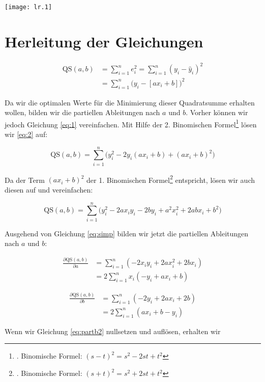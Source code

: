 \documentclass{scrartcl}
\def\qs{\text{QS}(a,b)}
\def\sm{\sum\limits_{i=1}^{n}}
\begin{document}
\begin{center}
\texttt{[image: lr.1]}
\end{center}

\section{Herleitung der Gleichungen}


\begin{align}\label{eq:1}
\qs	&= \sum_{i=1}^{n} e_i^2 = \sm (y_i - \hat{y}_i)^2\\
								&= \sm \Big(y_i - [ax_i+b]\Big)^2 \label{eq:2}
\end{align}

Da wir die optimalen Werte für die Minimierung dieser Quadratsumme erhalten wollen, bilden wir die partiellen Ableitungen nach $a$ und $b$. Vorher können wir jedoch Gleichung \ref{eq:1} vereinfachen. Mit Hilfe der 2. Binomischen Formel\footnote{. Binomische Formel: \((s-t)^2 = s^2 -2st + t^2\)} lösen wir \ref{eq:2} auf:

\begin{equation}
	\qs = \sm \Big(y_i^2 - 2y_i (ax_i+b) + (ax_i +b)^2\Big)
\end{equation}

Da der Term \((ax_i +b)^2\) der 1. Binomischen Formel\footnote{. Binomische Formel: \((s+t)^2 = s^2 +2st + t^2\)} entspricht, lösen wir auch diesen auf und vereinfachen:

\begin{equation}
	\qs = \sm \Big(y_i^2 - 2ax_iy_i - 2by_i + a^2x_i^2 + 2abx_i + b^2\Big)\label{eq:simp}
\end{equation}

Ausgehend von Gleichung \ref{eq:simp} bilden wir jetzt die partiellen Ableitungen nach $a$ und $b$:

\begin{align}
\frac{\partial \qs}{\partial a}	&= \sm (-2x_iy_i + 2ax_i^2 + 2bx_i) \label{eq:parta1}\\
								&= 2 \sm x_i(-y_i + ax_i + b) \label{eq:parta2} 
\end{align}

\begin{align}
\frac{\partial \qs}{\partial b}	&= \sm (-2y_i+2ax_i +2b) \label{eq:partb1}\\
								&= 2 \sm (ax_i + b -y_i) \label{eq:partb2}
\end{align}

Wenn wir Gleichung \ref{eq:partb2} nullsetzen und auflösen, erhalten wir 
\end{document}
